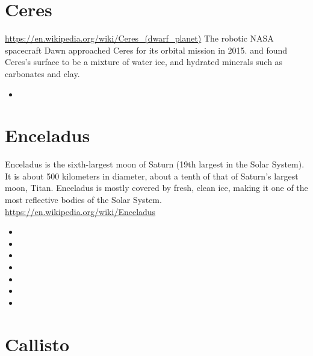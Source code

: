 \section{Ceres}

\url{https://en.wikipedia.org/wiki/Ceres_(dwarf_planet)}
The robotic NASA spacecraft Dawn approached Ceres for its orbital mission in 2015.
and found Ceres's surface to be a mixture of water ice, and hydrated minerals such as carbonates and clay. 

\begin{small}
\begin{itemize}
\item[\twothousandtwentytwo] 
\end{itemize}
\end{small}

\section{Enceladus}

Enceladus is the sixth-largest moon of Saturn (19th largest in the Solar System). 
It is about 500 kilometers in diameter, about a tenth of that of Saturn's largest moon, Titan. 
Enceladus is mostly covered by fresh, clean ice, making it one of the most reflective bodies 
of the Solar System. 
\url{https://en.wikipedia.org/wiki/Enceladus}

\begin{small}
\begin{itemize}
\item[\twothousandeight] 
\item[\twothousandnine]
\item[\twothousandten]
\item[\twothousandtwelve] 
\item[\twothousandthirteen] 
\item[\twothousandfourteen]
\item[\twothousandtwentytwo] 
\end{itemize}
\end{small}

\section{Callisto}

